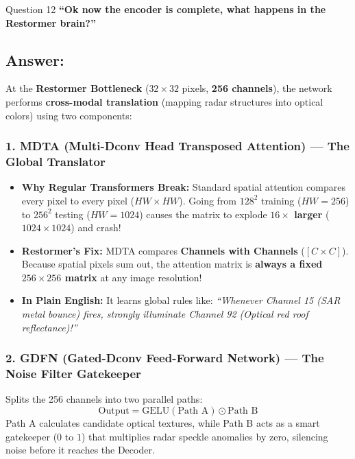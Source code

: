 \documentclass[11pt,a4paper]{article}
\begin{document}
\begin{questionbox}{Question 12}
\textbf{``Ok now the encoder is complete, what happens in the Restormer brain?''}
\end{questionbox}

\subsection*{Answer:}
At the \textbf{Restormer Bottleneck} ($32 \times 32$ pixels, \textbf{256 channels}), the network performs \textbf{cross-modal translation} (mapping radar structures into optical colors) using two components:

\subsubsection*{1. MDTA (Multi-Dconv Head Transposed Attention) --- The Global Translator}
\begin{itemize}[leftmargin=1.5em]
    \item \textbf{Why Regular Transformers Break:} Standard spatial attention compares every pixel to every pixel ($HW \times HW$). Going from $128^2$ training ($HW=256$) to $256^2$ testing ($HW=1024$) causes the matrix to explode \textbf{$16\times$ larger} ($1024 \times 1024$) and crash!
    \item \textbf{Restormer's Fix:} MDTA compares \textbf{Channels with Channels} ($[C \times C]$). Because spatial pixels sum out, the attention matrix is \textbf{always a fixed $256 \times 256$ matrix} at any image resolution!
    \item \textbf{In Plain English:} It learns global rules like: \textit{``Whenever Channel 15 (SAR metal bounce) fires, strongly illuminate Channel 92 (Optical red roof reflectance)!''}
\end{itemize}

\subsubsection*{2. GDFN (Gated-Dconv Feed-Forward Network) --- The Noise Filter Gatekeeper}
Splits the 256 channels into two parallel paths:
$$\text{Output} = \text{GELU}(\text{Path A}) \odot \text{Path B}$$
Path A calculates candidate optical textures, while Path B acts as a smart gatekeeper ($0$ to $1$) that multiplies radar speckle anomalies by zero, silencing noise before it reaches the Decoder.

\bigskip

\end{document}
